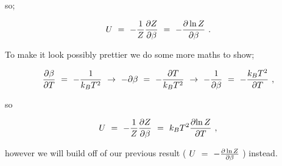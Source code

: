 \documentclass{article}
\begin{document}
so;

\begin{equation} \label{eq:1}
U \hspace{0.125cm} = \hspace{0.125cm} - \frac{1}{Z} \frac{\partial{Z}}{\partial{\beta}} \hspace{0.125cm} = \hspace{0.125cm} - \frac{\partial \ln{Z}}{\partial{\beta}} \hspace{0.125cm} .
\end{equation}

To make it look possibly prettier we do some more maths to show;

\begin{equation} \label{eq:1}
\frac{\partial{\beta}}{\partial{T}} \hspace{0.125cm} = \hspace{0.125cm} - \frac{1}{k_B T^2} \hspace{0.125cm} \rightarrow \hspace{0.125cm} - \partial{\beta} \hspace{0.125cm} = \hspace{0.125cm} - \frac{\partial{T}}{k_B T^2} \hspace{0.125cm} \rightarrow \hspace{0.125cm} - \frac{1}{\partial{\beta}} \hspace{0.125cm} = \hspace{0.125cm} - \frac{k_B T^2}{\partial{T}} \hspace{0.125cm} , 
\end{equation}

so 

\begin{equation} \label{eq:1}
U \hspace{0.125cm} = \hspace{0.125cm} - \frac{1}{Z} \frac{\partial{Z}}{\partial{\beta}} \hspace{0.125cm} = \hspace{0.125cm} k_B T^2 \frac{\partial{\ln{Z}}}{\partial{T}} \hspace{0.125cm} ,
\end{equation}

however we will build off of our previous result ( \begin{math} U \hspace{0.125cm} = \hspace{0.125cm} - \frac{\partial \ln{Z}}{\partial{\beta}} \end{math} ) instead.
\end{document}
